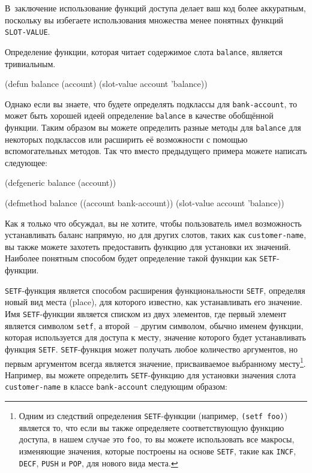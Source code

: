 В~заключение использование функций доступа делает ваш код более аккуратным, поскольку вы
избегаете использования множества менее понятных функций \lstinline{SLOT-VALUE}.

Определение функции, которая читает содержимое слота \lstinline{balance}, является тривиальным.

\begin{myverb}
(defun balance (account)
  (slot-value account 'balance))
\end{myverb}

Однако если вы знаете, что будете определять подклассы для \lstinline{bank-account}, то
может быть хорошей идеей определение \lstinline{balance} в качестве обобщённой функции.  Таким
образом вы можете определить разные методы для \lstinline{balance} для некоторых подклассов
или расширить её возможности с помощью вспомогательных методов. Так что вместо предыдущего
примера можете написать следующее:

\begin{myverb}
(defgeneric balance (account))

(defmethod balance ((account bank-account))
  (slot-value account 'balance))
\end{myverb}

Как я только что обсуждал, вы не хотите, чтобы пользователь имел возможность устанавливать
баланс напрямую, но для других слотов, таких как \lstinline{customer-name}, вы также можете
захотеть предоставить функцию для установки их значений.  Наиболее понятным способом будет
определение такой функции как \lstinline{SETF}-функции.

\lstinline{SETF}-функция является способом расширения функциональности \lstinline{SETF}, определяя
новый вид места (place), для которого известно, как устанавливать его значение.  Имя
\lstinline{SETF}-функции является списком из двух элементов, где первый элемент является
символом \lstinline{setf}, а второй~-- другим символом, обычно именем функции, которая
используется для доступа к месту, значение которого будет устанавливать функция
\lstinline{SETF}.  \lstinline{SETF}-функция может получать любое количество аргументов, но первым
аргументом всегда является значение, присваиваемое выбранному месту\footnote{Одним из
  следствий определения \lstinline{SETF}-функции (например, \lstinline{(setf foo)}) является то, что
  если вы также определяете соответствующую функцию доступа, в нашем случае это
  \lstinline{foo}, то вы можете использовать все макросы, изменяющие значения, которые построены
  на основе \lstinline{SETF}, такие как \lstinline{INCF}, \lstinline{DECF}, \lstinline{PUSH} и \lstinline{POP}, для
  нового вида места.}\hspace{\footnotenegspace}.  Например, вы можете определить \lstinline{SETF}-функцию для установки
значения слота \lstinline{customer-name} в классе \lstinline{bank-account} следующим образом:

